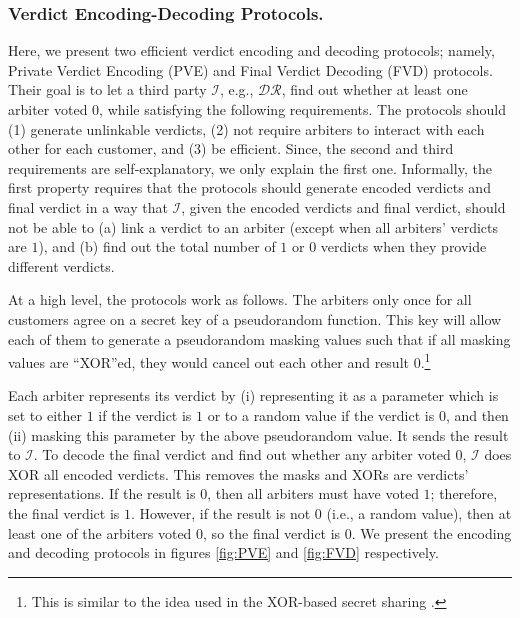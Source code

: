 
\subsubsection{Verdict Encoding-Decoding Protocols.}


Here, we present two efficient verdict encoding and decoding protocols; namely, Private Verdict Encoding (PVE) and Final Verdict Decoding (FVD) protocols. Their goal is to let a third party $\mathcal{I}$, e.g., $\mathcal{DR}$, find out whether at least one arbiter voted $0$, while satisfying the following  requirements.  The protocols should (1) generate unlinkable verdicts, (2)  not require arbiters to interact with each other for each customer, and (3) be  efficient. Since, the second and third requirements are self-explanatory,  we only explain the first one.  Informally, the first property requires  that the protocols should generate encoded verdicts and final verdict in a way that $\mathcal{I}$,  given the encoded verdicts and final verdict, should not be able to (a)   link a  verdict to an arbiter (except when all arbiters' verdicts are $1$), and (b) find out the total number of $1$ or $0$ verdicts when they provide different verdicts. 



 At a high level, the protocols work as follows.  The arbiters only once for all customers agree on a secret key of a pseudorandom function. This key will allow each of them to generate a pseudorandom masking values such that if all masking values are ``XOR''ed, they would cancel out each other and result $0$.\footnote{This is similar to the idea used in the XOR-based secret sharing \cite{Schneier0078909}.}
 
 
 
 
 
Each arbiter represents its verdict by (i) representing it as a parameter which is set to either $1$ if the verdict is $1$ or to a random value if the verdict is $0$, and then (ii) masking this parameter by the above  pseudorandom value.  It sends the result to $\mathcal{I}$.  To decode the final verdict and find out whether any arbiter voted $0$, $\mathcal{I}$  does XOR all encoded verdicts. This removes the masks and XORs are verdicts' representations.  If the result is $0$, then    all arbiters must have voted $1$; therefore,  the final verdict is $1$. However, if the result is not $0$ (i.e., a random value), then at least one of the arbiters voted $0$, so  the final verdict is $0$. We present the encoding  and decoding protocols in figures \ref{fig:PVE} and \ref{fig:FVD} respectively.
 
